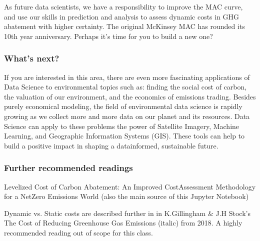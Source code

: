 \documentclass[letterpaper,10pt,english]{jupyterBook}
\begin{document}
\sphinxAtStartPar
{} As future data scientists, we have a responsibility to improve the MAC curve, and use our skills in prediction and analysis to assess dynamic costs in GHG abatement with higher certainty. The original McKinsey MAC has rounded its 10th year anniversary. Perhaps it’s time for you to build a new one?

\sphinxAtStartPar
{}


\subsubsection{What’s next?}
\label{\detokenize{content/12-environmental/textbook1:what-s-next}}
\sphinxAtStartPar
If you are interested in this area, there are even more fascinating applications of Data Science to environmental topics such as: finding the social cost of carbon, the valuation of our environment, and the economics of emissions trading. Besides purely economical modeling, the field of environmental data science is rapidly growing as we collect more and more data on our planet and its resources. Data Science can apply to these problems the power of Satellite Imagery, Machine Learning, and Geographic Information Systems (GIS).  These tools can help to build a positive impact in shaping a data\sphinxhyphen{}informed, sustainable future.


\subsubsection{Further recommended readings}
\label{\detokenize{content/12-environmental/textbook1:further-recommended-readings}}
\sphinxAtStartPar
Levelized Cost of Carbon Abatement: An Improved Cost\sphinxhyphen{}Assessment Methodology for a Net\sphinxhyphen{}Zero Emissions World (also the main source of this Jupyter Notebook)

\sphinxAtStartPar
{}

\sphinxAtStartPar
Dynamic vs. Static costs are described further in in K.Gillingham \& J.H Stock’s The Cost of Reducing Greenhouse Gas Emissions (italic) from 2018. \sphinxhyphen{} A highly recommended reading out of scope for this class.

\sphinxAtStartPar
{}
\end{document}
